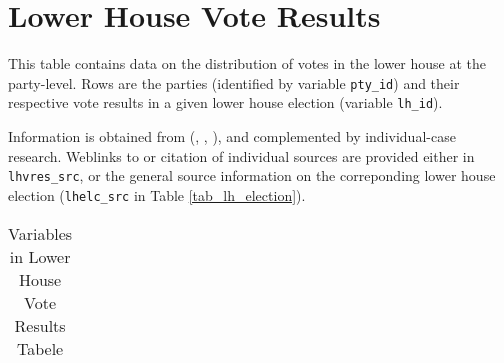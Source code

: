 \section{Lower House Vote Results}\label{sec_lower_house_vote_results}
This table contains data on the distribution of votes in the lower house at the party-level. 
Rows are the parties (identified by variable \texttt{\footnotesize pty\_id}) and their respective vote results in a given lower house election (variable \texttt{\footnotesize lh\_id}).

Information is obtained  from \citeauthor{Nohlen2001} (\citeyear{Nohlen2001}, \citeyear{Nohlen2005}, \citeyear{Nohlen2010}), and complemented by individual-case research. Weblinks to or citation of individual sources are provided either in \texttt{\footnotesize lhvres\_src}, or the general source information on the correponding lower house election (\texttt{\footnotesize lhelc\_src} in Table \ref{tab_lh_election}).


\begin{center}
\begin{longtable}{L{4cm} L{6cm} L{3cm}}
\caption{Variables in Lower House Vote Results Tabele\label{tab_lower_house_vote_results}}


\end{longtable}
\end{center}
